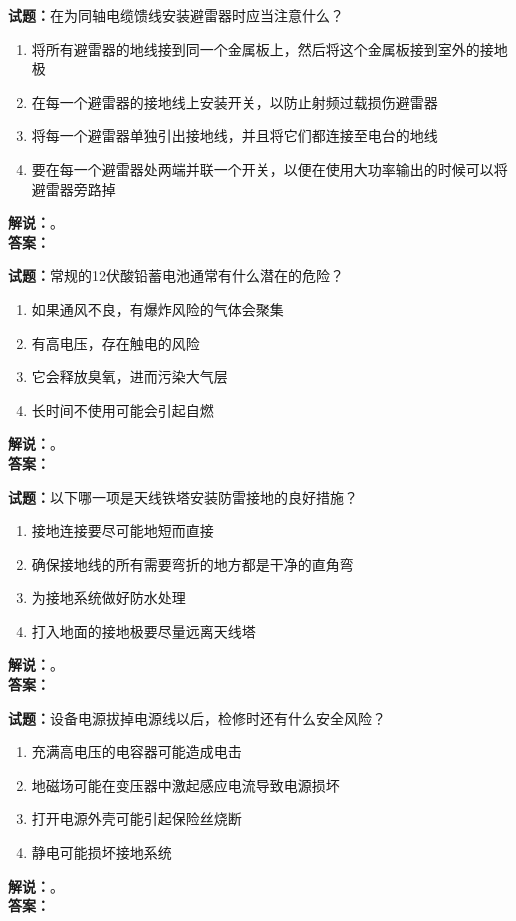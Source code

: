 \documentclass{ctexbook}
\begin{document}
\bigskip

\noindent\textbf{试题：}在为同轴电缆馈线安装避雷器时应当注意什么？
\begin{enumerate}[leftmargin=3em]
  \item 将所有避雷器的地线接到同一个金属板上，然后将这个金属板接到室外的接地极
  \item 在每一个避雷器的接地线上安装开关，以防止射频过载损伤避雷器
  \item 将每一个避雷器单独引出接地线，并且将它们都连接至电台的地线
  \item 要在每一个避雷器处两端并联一个开关，以便在使用大功率输出的时候可以将避雷器旁路掉
\end{enumerate}
\noindent\textbf{解说：}\textbf{}。\\\noindent\textbf{答案：}

\bigskip

\noindent\textbf{试题：}常规的12伏酸铅蓄电池通常有什么潜在的危险？
\begin{enumerate}[leftmargin=3em]
  \item 如果通风不良，有爆炸风险的气体会聚集
  \item 有高电压，存在触电的风险
  \item 它会释放臭氧，进而污染大气层
  \item 长时间不使用可能会引起自燃
\end{enumerate}
\noindent\textbf{解说：}\textbf{}。\\\noindent\textbf{答案：}

\bigskip

\noindent\textbf{试题：}以下哪一项是天线铁塔安装防雷接地的良好措施？
\begin{enumerate}[leftmargin=3em]
  \item 接地连接要尽可能地短而直接
  \item 确保接地线的所有需要弯折的地方都是干净的直角弯
  \item 为接地系统做好防水处理
  \item 打入地面的接地极要尽量远离天线塔
\end{enumerate}
\noindent\textbf{解说：}\textbf{}。\\\noindent\textbf{答案：}

\bigskip

\noindent\textbf{试题：}设备电源拔掉电源线以后，检修时还有什么安全风险？
\begin{enumerate}[leftmargin=3em]
  \item 充满高电压的电容器可能造成电击
  \item 地磁场可能在变压器中激起感应电流导致电源损坏
  \item 打开电源外壳可能引起保险丝烧断
  \item 静电可能损坏接地系统
\end{enumerate}
\noindent\textbf{解说：}\textbf{}。\\\noindent\textbf{答案：}
\end{document}
